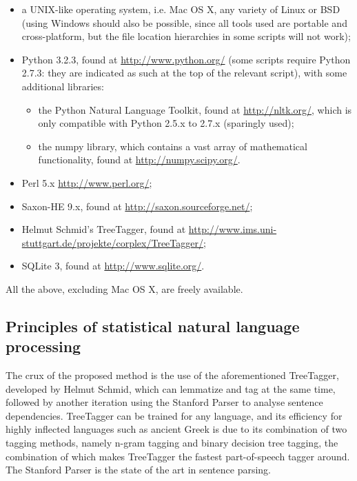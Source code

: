 \begin{itemize}

  \item a UNIX-like operating system, i.e. Mac OS X, any variety of Linux or
    BSD (using Windows should also be possible, since all tools used are
    portable and cross-platform, but the file location hierarchies in some
    scripts will not work);

  \item Python 3.2.3, found at \url{http://www.python.org/} (some scripts
    require Python 2.7.3: they are indicated as such at the top of the relevant
    script), with some additional libraries:

    \begin{itemize}

      \item the Python Natural Language Toolkit, found at
        \url{http://nltk.org/}, which is only compatible with Python 2.5.x to
        2.7.x (sparingly used);

      \item the numpy library, which contains a vast array of mathematical
        functionality, found at \url{http://numpy.scipy.org/}.

    \end{itemize}

  \item Perl 5.x \url{http://www.perl.org/};

  \item Saxon-HE 9.x, found at \url{http://saxon.sourceforge.net/};

  \item Helmut Schmid's TreeTagger, found at
    \url{http://www.ims.uni-stuttgart.de/projekte/corplex/TreeTagger/};

  \item SQLite 3, found at \url{http://www.sqlite.org/}.

\end{itemize}

All the above, excluding Mac OS X, are freely available.



\subsection{Principles of statistical natural language processing} %
\label{sub:principles-nlp}

The crux of the proposed method is the use of the aforementioned TreeTagger,
developed by Helmut Schmid, which can lemmatize and tag at the same time,
followed by another iteration using the Stanford Parser to analyse sentence
dependencies. TreeTagger can be trained for any language, and its efficiency
for highly inflected languages such as ancient Greek is due to its combination
of two tagging methods, namely n-gram tagging and binary decision tree tagging,
the combination of which makes TreeTagger the fastest part-of-speech tagger
around. The Stanford Parser is the state of the art in sentence parsing.

